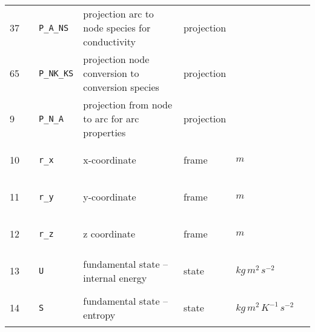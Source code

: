 \begin{longtable}{|p{1cm}|p{2.5cm}|p{4.5cm}|p{8cm}|p{3.0cm}|p{3cm}|p{1cm}|}
        37
             & \hypertarget{"v:37"}{ $ {} $}
             & \verb|P_A_NS|
             & projection arc to node species for conductivity
             & \begin{lay}projection \end{lay}
             & $  $
             & \\
        65
             & \hypertarget{"v:65"}{ $ {} $}
             & \verb|P_NK_KS|
             & projection node conversion to conversion species
             & \begin{lay}projection \end{lay}
             & $  $
             & \\
        9
             & \hypertarget{"v:9"}{ $ {} $}
             & \verb|P_N_A|
             & projection from node to arc for arc properties
             & \begin{lay}projection \end{lay}
             & $  $
             & \\
        10
             & \hypertarget{"v:10"}{ $ {} $}
             & \verb|r_x|
             & x-coordinate
             & \begin{lay}frame \end{lay}
             & $ m  $
             & \\
        11
             & \hypertarget{"v:11"}{ $ {} $}
             & \verb|r_y|
             & y-coordinate
             & \begin{lay}frame \end{lay}
             & $ m  $
             & \\
        12
             & \hypertarget{"v:12"}{ $ {} $}
             & \verb|r_z|
             & z coordinate
             & \begin{lay}frame \end{lay}
             & $ m  $
             & \\
        13
             & \hypertarget{"v:13"}{ $ {} $}
             & \verb|U|
             & fundamental state -- internal energy
             & \begin{lay}state \end{lay}
             & $ kg \,m^{2} \,s^{-2} \, $
             & \\
        14
             & \hypertarget{"v:14"}{ $ {} $}
             & \verb|S|
             & fundamental state -- entropy
             & \begin{lay}state \end{lay}
             & $ kg \,m^{2} \,K^{-1} \,s^{-2} \, $

\end{longtable}
